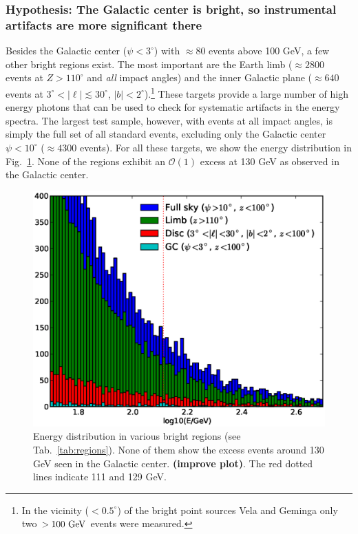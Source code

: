 \documentclass[aps,twocolumn,prd,superscriptaddress,showpacs,nofootinbib,fixfloat]{revtex4}
\newcommand{\GeV}{{\rm ~GeV}}
\begin{document}
\subsubsection{Hypothesis: The Galactic center is bright, so instrumental
artifacts are more significant there}

Besides the Galactic center ($\psi<3^\circ$) with $\approx80$ events above 100
GeV, a few other bright regions exist.  The most important are the Earth limb
($\approx2800$ events at $Z>110^\circ$ and \emph{all} impact angles) and the
inner Galactic plane ($\approx640$ events at $3^\circ<|\ell|\lesssim30^\circ$,
$|b|<2^\circ$).\footnote{In the vicinity ($<0.5^\circ$) of the bright point
sources Vela and Geminga only two $>100\GeV$ events were measured.} These
targets provide a large number of high energy photons that can be used to
check for systematic artifacts in the energy spectra. The largest test sample,
however, with events at all impact angles, is simply the full set of all
standard events, excluding only the Galactic center $\psi<10^\circ$ ($\approx
4300$ events). For all these targets, we show the energy distribution in
Fig.~\ref{fig:target_spectra}.  None of the regions exhibit an
$\mathcal{O}(1)$ excess at 130 GeV as observed in the Galactic center.

\begin{figure}
  \centering
  \includegraphics[width=1.0\linewidth]{plots/target_spectra.eps}
  \caption{Energy distribution in various bright regions (see
  Tab.~\ref{tab:regions}).  None of them show the excess events around 130 GeV
  seen in the Galactic center.  \textbf{(improve plot)}. The red dotted lines
  indicate 111 and 129 GeV.}
  \label{fig:target_spectra}
\end{figure}
\end{document}
